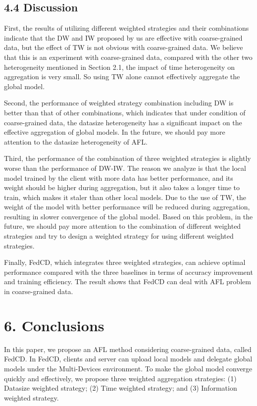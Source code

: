 \documentclass[twoside,twocolumn]{article}
\begin{document}
\begin{spacing}{1.0}
%
\subsection{4.4 Discussion}

	First, the results of utilizing different weighted strategies and their combinations indicate that the DW and IW proposed by us are effective with coarse-grained data, but the effect of TW is not obvious with coarse-grained data. We believe that this is an experiment with coarse-grained data, compared with the other two heterogeneity mentioned in Section 2.1, the impact of time heterogeneity on aggregation is very small. So using TW alone cannot effectively aggregate the global model.
	
	Second, the performance of weighted strategy combination including DW is better than that of other combinations, which indicates that under condition of coarse-grained data, the datasize heterogeneity has a significant impact on the effective aggregation of global models. In the future, we should pay more attention to the datasize heterogeneity of AFL.
	
	Third, the performance of the combination of three weighted strategies is slightly worse than the performance of DW-IW. The reason we analyze is that the local model trained by the client with more data has better performance, and its weight should be higher during aggregation, but it also takes a longer time to train, which makes it staler than other local models. Due to the use of TW, the weight of the model with better performance will be reduced during aggregation, resulting in slower convergence of the global model. Based on this problem, in the future, we should pay more attention to the combination of different weighted strategies and try to design a weighted strategy for using different weighted strategies.
	
	Finally, FedCD, which integrates three weighted strategies, can achieve optimal performance compared with the three baselines in terms of accuracy improvement and training efficiency. The result shows that FedCD can deal with AFL problem in coarse-grained data.
\section{6. Conclusions}

	In this paper, we propose an AFL method considering coarse-grained data, called FedCD. In FedCD, clients and server can upload local models and delegate global models under the Multi-Devices environment. To make the global model converge quickly and effectively, we propose three weighted aggregation strategies: (1) Datasize weighted strategy; (2) Time weighted strategy; and (3) Information weighted strategy.
	

\end{spacing}
\end{document}
